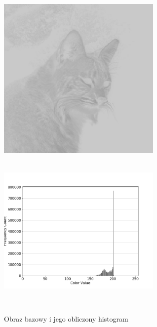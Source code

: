 \documentclass[a4paper,12pt]{book}
\begin{document}
\begin{figure}[H]
	\label{fig:cat-bright-extend-histogram}
	\caption{Obraz bazowy i jego obliczony histogram}
	\includegraphics[width=8cm, height=8cm]{cat-bright-unmodified.png}
	\includegraphics[width=8cm, height=8cm]{5-1/calculate-cat-bright.png}
	

\end{figure}
\end{document}
